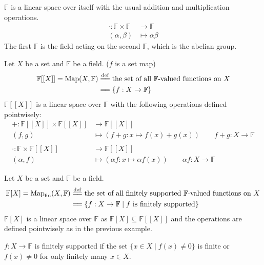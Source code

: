 \documentclass[
	11pt, %
	fleqn, %
	a4paper, %
]{LegrandOrangeBook}
\newcommand{\F}{\mathbb{F}} %
\newcommand{\Map}{\text{Map}} %
\begin{document}
\begin{example}
    $\F$ is a linear space over itself with the usual addition and multiplication operations.
    \[
        \begin{split}
            \cdot : \F \times \F &\to \F \\
            (\alpha,\beta) &\mapsto \alpha \beta
        \end{split}
    \]
    The first $\F$ is the field acting on the second $\F$, which is the abelian group.
\end{example}

\begin{example}
    Let $X$ be a set and $\F$ be a field. ($f$ is a set map)
    \[
    \begin{split}
        \F[[X]] = \Map(X, \F) &\overset{\mathrm{def}}{=\joinrel=} \text{the set of all $\F$-valued functions on } X \\
        &=\joinrel= \left\{ f : X \to \F \right\}
    \end{split}
    \]
    $\F[[X]]$ is a linear space over $\F$ with the following operations defined pointwisely:
    \[
        \begin{split}
            + : \F[[X]] \times \F[[X]] &\to \F[[X]] \\
            (f,g) &\mapsto (f+g: x \mapsto f(x) + g(x)) \qquad f + g : X \to \F \\ \\
            \cdot : \F \times \F[[X]] &\to \F[[X]] \\
            (\alpha,f) &\mapsto (\alpha f: x \mapsto \alpha f(x)) \qquad \alpha f : X \to \F
        \end{split}
    \]
\end{example}

\begin{example}
    Let $X$ be a set and $\F$ be a field.
    \[
        \begin{split}
            \F[X] = \text{Map}_{\text{fin}}(X, \F) &\overset{\mathrm{def}}{=\joinrel=} \text{the set of all finitely supported $\F$-valued functions on } X \\
            &=\joinrel= \left\{ f : X \to \F \mid f \text{ is finitely supported} \right\}
        \end{split}
    \]
    $\F[X]$ is a linear space over $\F$ as $\F[X] \subseteq \F[[X]]$ and the operations are defined pointwisely as in the previous example.

    $f: X \to \F$ is finitely supported if the set $\{ x \in X \mid f(x) \neq 0 \}$ is finite or $f(x) \neq 0$ for only finitely many $x \in X$.
\end{example}
\end{document}
